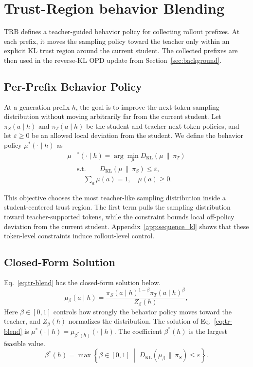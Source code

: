 \documentclass{llmxive}
\begin{document}
\section{Trust-Region behavior Blending}
\label{sec:method}

TRB defines a teacher-guided behavior policy for collecting rollout prefixes.
At each prefix, it moves the sampling policy toward the teacher only within an explicit KL trust region around the current student.
The collected prefixes are then used in the reverse-KL OPD update from Section~\ref{sec:background}.

\subsection{Per-Prefix Behavior Policy}

At a generation prefix $h$, the goal is to improve the next-token sampling distribution without moving arbitrarily far from the current student.
Let $\pi_S(a\mid h)$ and $\pi_T(a\mid h)$ be the student and teacher next-token policies, and let $\varepsilon\ge0$ be an allowed local deviation from the student.
We define the behavior policy $\mu^*(\cdot \mid h)$ as
\begin{equation}
\label{eq:tr-blend}
\begin{aligned}
\mu&^*(\cdot \mid h)= \arg\min_{\mu}
D_{\mathrm{KL}}(\mu \,\|\, \pi_T)\\
&\text{s.t.}\qquad
D_{\mathrm{KL}}(\mu \,\|\, \pi_S) \le \varepsilon,\\
&\quad \sum_a \mu(a) = 1,
\quad\mu(a) \ge 0.
\end{aligned}
\end{equation}

This objective chooses the most teacher-like sampling distribution inside a student-centered trust region.
The first term pulls the sampling distribution toward teacher-supported tokens, while the constraint bounds local off-policy deviation from the current student.
Appendix~\ref{app:sequence_kl} shows that these token-level constraints induce rollout-level control.

\subsection{Closed-Form Solution}

Eq.~\ref{eq:tr-blend} has the closed-form solution below.
\begin{equation}
\mu_\beta(a \mid h)
=
\frac{
\pi_S(a \mid h)^{1-\beta}
\pi_T(a \mid h)^\beta
}{
Z_\beta(h)
},
\label{eq:geom-family}
\end{equation}
Here $\beta \in [0,1]$ controls how strongly the behavior policy moves toward the teacher, and $Z_\beta(h)$ normalizes the distribution.
The solution of Eq.~\ref{eq:tr-blend} is $\mu^*(\cdot\mid h)=\mu_{\beta^*(h)}(\cdot\mid h)$.
The coefficient $\beta^*(h)$ is the largest feasible value.
\begin{equation*}
\beta^*(h)
=
\max
\left\{
\beta \in [0,1]
\;\middle|\;
D_{\mathrm{KL}}(\mu_\beta \,\|\, \pi_S) \le \varepsilon
\right\}.
\end{equation*}
\end{document}
